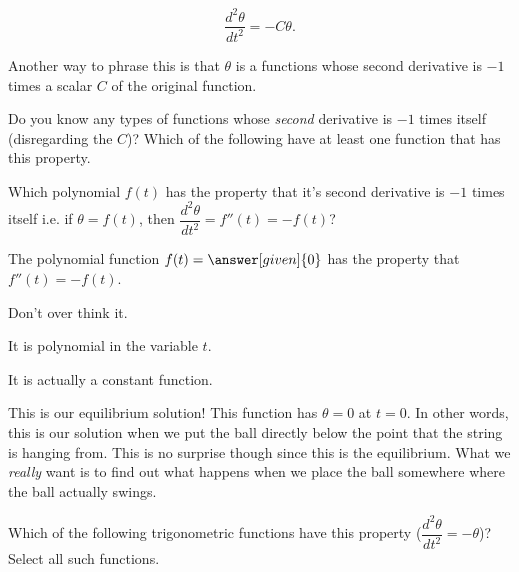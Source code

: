 \documentclass[handout,nooutcomes]{ximera}
\begin{document}
\begin{example}
\begin{explanation}
\[
\dfrac{d^2 \theta}{d t^2}  = -C\theta.
\]

Another way to phrase this is that $\theta$ is a functions whose
second derivative is $-1$ times a scalar $C$ of the original function.

\begin{question}
Do you know any types of functions whose \emph{second} derivative
is $-1$ times itself (disregarding the $C$)? Which of the following have at least one function that has this property.

\begin{selectAll}
\end{selectAll}
\end{question}

\begin{question}
Which polynomial $f(t)$ has the property that it's second
derivative is $-1$ times itself i.e. if
$\theta=f(t)$, then $\dfrac{d^2 \theta}{d t^2} = f''(t) = -f(t)$?


The polynomial function $f(t) = \answer[given]{0}$ has the property that $f''(t) = -f(t)$.

\begin{hint}
Don't over think it.
\end{hint}
\begin{hint}
It is polynomial in the variable $t$.
\end{hint}
\begin{hint}
It is actually a constant function.
\end{hint}
\end{question}

This is our equilibrium solution! This function has $\theta=0$ at $t=0$. In other
words, this is our solution when we put the ball directly below the point
that the string is hanging from. This is no surprise though since this
is the equilibrium. What we \emph{really} want is to find out what happens
when we place the ball somewhere where the ball actually swings.

\begin{question}
Which of the following trigonometric functions have this property
($\dfrac{d^2 \theta}{d t^2} = -\theta$)? Select all such functions.
\begin{selectAll}
\end{selectAll}
\end{question}


\end{explanation}
\end{example}
\end{document}
